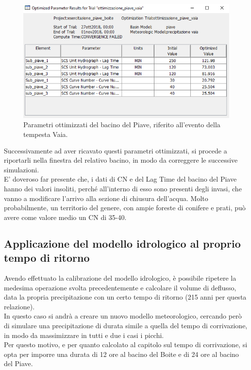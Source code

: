\begin{figure}[H]\centering
    \includegraphics[scale=1]{immagini/par_ottimiz_piave.PNG}
    \caption{Parametri ottimizzati del bacino del Piave, riferito all'evento della tempesta Vaia.}
        \label{par_ottim_boite}    
    \end{figure}

Successivamente ad aver ricavato questi parametri ottimizzati, si procede a riportarli nella finestra del relativo bacino, in modo da correggere le successive simulazioni.\\
E' doveroso far presente che, i dati di CN e del Lag Time del bacino del Piave hanno dei valori insoliti, perché all'interno di esso sono presenti degli invasi, che vanno a modificare l'arrivo alla sezione di chiusura dell'acqua. Molto probabilmente, un territorio del genere, con ampie foreste di conifere e prati, può avere come valore medio un CN di 35-40.

\subsection{Applicazione del modello idrologico al proprio tempo di ritorno}
Avendo effettuato la calibrazione del modello idrologico, è possibile ripetere la medesima operazione svolta precedentemente e calcolare il volume di deflusso, data la propria precipitazione con un certo tempo di ritorno (215 anni per questa relazione).\\
In questo caso si andrà a creare un nuovo modello meteorologico, cercando però di simulare una precipitazione di durata simile a quella del tempo di corrivazione, in modo da massimizzare in tutti e due i casi i picchi.\\
Per questo motivo, e per quanto calcolato al capitolo sul tempo di corrivazione, si opta per imporre una durata di 12 ore al bacino del Boite e di 24 ore al bacino del Piave.

